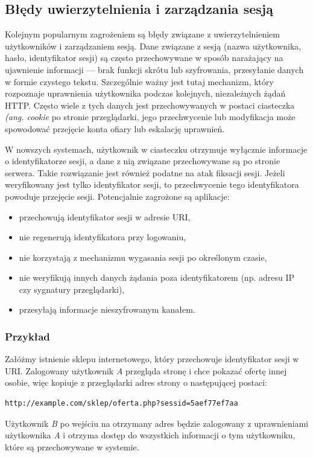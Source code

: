 \documentclass[11pt,a4paper,polish,thesis,oneside]{dcsbook}
\begin{document}
\subsection{Błędy uwierzytelnienia i zarządzania sesją}
Kolejnym popularnym zagrożeniem są błędy związane z uwierzytelnieniem użytkowników i zarządzaniem sesją. Dane związane z sesją (nazwa użytkownika, hasło, identyfikator sesji) są często przechowywane w sposób narażający na ujawnienie informacji --- brak funkcji skrótu lub szyfrowania, przesyłanie danych w formie czystego tekstu. Szczególnie ważny jest tutaj mechanizm, który rozpoznaje uprawnienia użytkownika podczas kolejnych, niezależnych żądań HTTP. Często wiele z tych danych jest przechowywanych w postaci ciasteczka \textit{(ang. cookie} po stronie przeglądarki, jego przechwycenie lub modyfikacja może spowodować przejęcie konta ofiary lub eskalację uprawnień.

W nowszych systemach, użytkownik w ciasteczku otrzymuje wyłącznie informacje o identyfikatorze sesji, a dane z nią związane przechowywane są po stronie serwera. Takie rozwiązanie jest również podatne na atak fiksacji sesji. Jeżeli weryfikowany jest tylko identyfikator sesji, to przechwycenie tego identyfikatora powoduje przejęcie sesji. Potencjalnie zagrożone są aplikacje:
\begin{itemize}
\item przechowują identyfikator sesji w adresie URI,
\item nie regenerują identyfikatora przy logowaniu,
\item nie korzystają z mechanizmu wygasania sesji po określonym czasie,
\item nie weryfikują innych danych żądania poza identyfikatorem (np. adresu IP czy sygnatury przeglądarki),
\item przesyłają informacje nieszyfrowanym kanałem.
\end{itemize}

\subsubsection*{Przykład}
Załóżmy istnienie sklepu internetowego, który przechowuje identyfikator sesji w URI. Zalogowany użytkownik \textit{A} przegląda stronę i chce pokazać ofertę innej osobie, więc kopiuje z przeglądarki adres strony o następującej postaci:
\begin{lstlisting}
http://example.com/sklep/oferta.php?sessid=5aef77ef7aa
\end{lstlisting}
Użytkownik \textit{B} po wejściu na otrzymany adres będzie zalogowany z uprawnieniami użytkownika \textit{A} i otrzyma dostęp do wszystkich informacji o tym użytkowniku, które są przechowywane w systemie.
\end{document}
